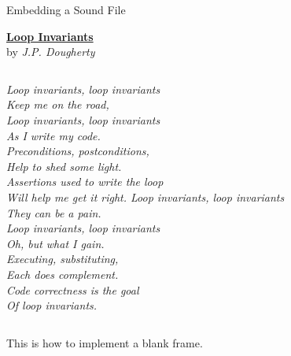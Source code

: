 \documentclass[10pt, xcolor={table}]{beamer}
\begin{document}
\begin{frame}{Embedding a Sound File}
    \begin{center}
     \href{http://www.haverford.edu/computerscience/resources/songs/}{\textbf{Loop Invariants}}\\ by \textit{J.P. Dougherty} \\
    
    \bigskip


    
    \end{center}
    
    \bigskip
    
    \begin{columns}[]
    \footnotesize
    \it
     \column{5cm}
    Loop invariants, loop invariants\\
    Keep me on the road,\\
    Loop invariants, loop invariants\\
    As I write my code.\\
    \bigskip
    Preconditions, postconditions,\\
    Help to shed some light.\\
    Assertions used to write the loop\\
    Will help me get it right.
     \column{5cm}
    Loop invariants, loop invariants\\
    They can be a pain.\\
    Loop invariants, loop invariants\\
    Oh, but what I gain.\\
    \bigskip
    Executing, substituting,\\
    Each does complement.\\
    Code correctness is the goal\\
    Of loop invariants.
    \end{columns}
    \bigskip
\end{frame}


{
 \usebackgroundtemplate{ }

\begin{frame}[plain]{}
    This is how to implement a blank frame.
\end{frame}
}
\end{document}
